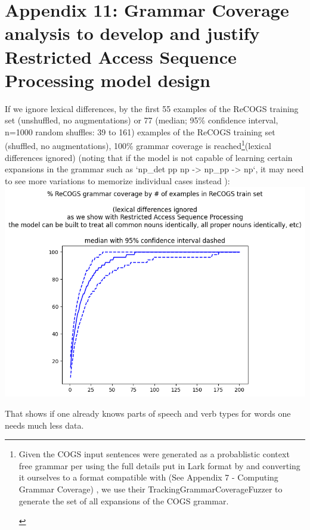 \documentclass[11pt]{article}
\begin{document}
\section{Appendix 11: Grammar Coverage analysis to develop and justify Restricted Access Sequence Processing model design}

If we ignore lexical differences, by the first 55 examples of the ReCOGS training set (unshuffled, no augmentations) or 77 (median; 95\% confidence interval, n=1000 random shuffles: 39 to 161) examples of the ReCOGS training set (shuffled, no augmentations), 100\% grammar coverage is reached\footnote{
\begin{tiny}
Given the COGS input sentences were generated as a probablistic context free grammar per \cite{KimLinzen2020}
using the full details put in Lark format by \cite{klinger2024compositionalprogramgenerationfewshot}
and converting it ourselves to a format compatible with \cite{fuzzingbook2023:GrammarCoverageFuzzer} (See Appendix 7 - Computing Grammar Coverage) , we use their TrackingGrammarCoverageFuzzer to generate the set of all expansions of the COGS grammar.
\end{tiny}
}(lexical differences ignored) \cite{fuzzingbook2023:GrammarCoverageFuzzer} (noting that if the model is not capable of learning certain expansions in the grammar such as `np\_det pp np -> np\_pp -> np`, it may need to see more variations to memorize individual cases instead ):
\includegraphics[scale=0.40]{grammar_coverage_by_number_of_recogs_training_examples_lexical_differences_ignored.png}

That shows if one already knows parts of speech and verb types for words one needs much less data.
\end{document}
